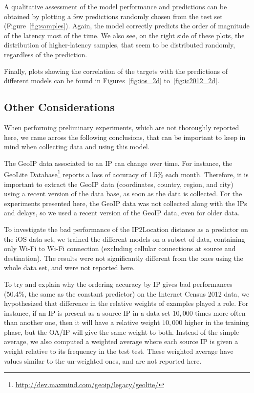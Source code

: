 \documentclass[10pt,a4paper,notitlepage,twocolumn]{article}
\begin{document}
A qualitative assessment of the model performance and predictions can
be obtained by plotting a few predictions randomly chosen from the test
set (Figure~\ref{fig:samples}).  Again, the model correctly predicts the
order of magnitude of the latency most of the time. We also see, on the
right side of these plots, the distribution of higher-latency samples,
that seem to be distributed randomly, regardless of the prediction.

Finally, plots showing the correlation of the targets with the
predictions of different models can be found in Figures~\ref{fig:ios_2d}
to~\ref{fig:ic2012_2d}.



\subsection{Other Considerations}

When performing preliminary experiments, which are not thoroughly
reported here, we came across the following conclusions, that can be
important to keep in mind when collecting data and using this model.

The GeoIP data associated to an IP can
change over time. For instance, the GeoLite
Database\footnote{\url{http://dev.maxmind.com/geoip/legacy/geolite/}}
reports a loss of accuracy of 1.5\% each month.  Therefore, it is
important to extract the GeoIP data (coordinates, country, region, and
city) using a recent version of the data base, as soon as the data is
collected.  For the experiments presented here, the GeoIP data was not
collected along with the IPs and delays, so we used a recent version of
the GeoIP data, even for older data.

To investigate the bad performance of the IP2Location distance as a
predictor on the iOS data set, we trained the different models on a
subset of data, containing only Wi-Fi to Wi-Fi connection (excluding
cellular connections at source and destination). The results were not
significantly different from the ones using the whole data set, and were
not reported here.

To try and explain why the ordering accuracy by IP gives bad
performances (50.4\%, the same as the constant predictor) on the
Internet Census 2012 data, we hypothesized that difference in the
relative weights of examples played a role. For instance, if an IP is
present as a source IP in a data set $10,000$ times more often than
another one, then it will have a relative weight $10,000$ higher in the
training phase, but the OA/IP will give the same weight to both. Instead
of the simple average, we also computed a weighted average where each
source IP is given a weight relative to its frequency in the test
test. These weighted average have values similar to the un-weighted ones,
and are not reported here.
\end{document}

